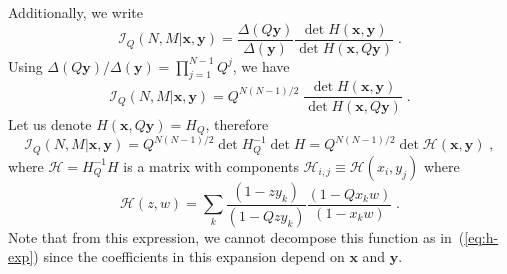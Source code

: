 \documentclass[a4paper,11pt]{amsart}
\begin{document}
Additionally, we write
\begin{equation}
  \mathcal{I}_Q(N,M | \bm{x}, \bm{y})  
  = \frac{\Delta(Q\bm{y})}{\Delta(\bm{y})}
  \frac{\det H(\bm{x}, \bm{y})}{\det H(\bm{x},Q \bm{y})} \; .
\end{equation}
Using \(\Delta(Q\bm{y})/ \Delta(\bm{y}) = \prod_{j=1}^{N-1} Q^j\), we have 
\begin{equation}
  \mathcal{I}_Q(N,M | \bm{x}, \bm{y}) =  Q^{N(N-1)/2}\;
  \frac{\det H(\bm{x}, \bm{y})}{\det H(\bm{x}, Q \bm{y})} \; .
\end{equation}
Let us denote \(H(\bm{x}, Q\bm{y}) = H_{Q}\), therefore
\begin{equation}
  \mathcal{I}_Q(N,M | \bm{x}, \bm{y}) = Q^{N(N-1)/2} \det H_{Q}^{-1} \det H
= Q^{N(N-1)/2} \det \mathcal{H}(\bm{x}, \bm{y}) \; ,
\end{equation}
where \(\mathcal{H} = H_{Q}^{-1} H\) is a matrix with components 
\(\mathcal{H}_{i,j} \equiv \mathcal{H}(x_i, y_j)\) where
\begin{equation}
  \mathcal{H}(z, w) = \sum_{k} \frac{(1 - z y_k)}{(1 - Q z y_k)} 
\frac{(1 - Q x_k w)}{(1 - x_k w)}\; .
\end{equation}
Note that from this expression, we cannot decompose this function as
in~(\ref{eq:h-exp}) since the coefficients in this expansion depend on
\(\bm{x}\) and \(\bm{y}\).

\end{document}
